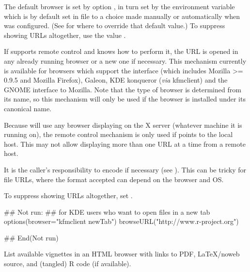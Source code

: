 %
\begin{Details}\relax
The default browser is set by option , in turn set by
the environment variable  which is by default set in
file  to a choice
made manually or automatically when \R{} was configured.  (See
 for where to override that default value.)
To suppress showing URLs altogether, use the value .

If  supports remote control and \R{} knows how to perform
it, the URL is opened in any already running browser or a new one if
necessary.  This mechanism currently is available for browsers which
support the  interface (which includes
Mozilla >= 0.9.5 and Mozilla Firefox), Galeon, KDE konqueror
(\emph{via} kfmclient) and the GNOME interface to Mozilla.  Note that
the type of browser is determined from its name, so this mechanism
will only be used if the browser is installed under its canonical
name.

Because  will use any browser displaying on the X
server (whatever machine it is running on), the remote control
mechanism is only used if  points to the local host.
This may not allow displaying more than one URL at a time from a
remote host.

It is the caller's responsibility to encode  if necessary
(see ).  This can be tricky for file URLs,
where the format accepted can depend on the browser and OS.

To suppress showing URLs altogether, set .
\end{Details}
%
\begin{Examples}
\begin{ExampleCode}
## Not run: ## for KDE users who want to open files in a new tab
options(browser="kfmclient newTab") 
browseURL("http://www.r-project.org")

## End(Not run)
\end{ExampleCode}
\end{Examples}
%
\begin{Description}\relax
List available vignettes in an HTML browser with links to PDF,
LaTeX/noweb source, and (tangled) R code (if available).
\end{Description}
